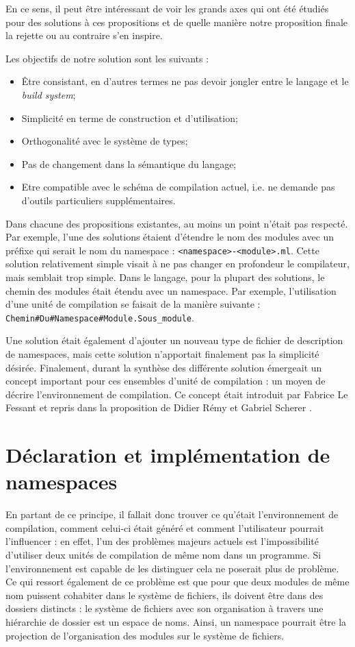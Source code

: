 \documentclass[11pt,a4paper]{report}
\begin{document}
En ce sens, il peut être intéressant de voir les grands axes qui ont été étudiés
pour des solutions à ces propositions et de quelle manière notre proposition
finale la rejette ou au contraire s'en inspire.

Les objectifs de notre solution sont les suivants :
\begin{itemize}
\item \^{E}tre consistant, en d'autres termes ne pas devoir jongler entre le
  langage et le \emph{build system};
\item Simplicité en terme de construction et d'utilisation;
\item Orthogonalité avec le système de types;
\item Pas de changement dans la sémantique du langage;
\item Etre compatible avec le schéma de compilation actuel, i.e. ne demande
  pas d'outils particuliers supplémentaires.
\end{itemize}

Dans chacune des propositions existantes, au moins un point n'était pas
respecté. Par exemple, l'une des solutions étaient d'étendre le nom des modules
avec un préfixe qui serait le nom du namespace :
\texttt{<namespace>-<module>.ml}. Cette solution relativement simple visait à ne
pas changer en profondeur le compilateur, mais semblait trop simple. Dans le
langage, pour la plupart des solutions, le chemin des modules était étendu avec
un namespace. Par exemple, l'utilisation d'une unité de compilation se faisait
de la manière suivante :
\texttt{Chemin\#Du\#Namespace\#Module.Sous\_module}. 

Une solution était également d'ajouter un nouveau type de fichier de description
de namespaces, mais cette solution n'apportait finalement pas la simplicité
désirée. Finalement, durant la synthèse des différente solution émergeait un
concept important pour ces ensembles d'unité de compilation : un moyen de
décrire l'environnement de compilation. Ce concept était introduit par Fabrice
Le Fessant \cite{lefessant-prop} et repris dans la proposition de Didier Rémy et
Gabriel Scherer \cite{remy-scherer-prop}.

\section{Déclaration et implémentation de namespaces}

En partant de ce principe, il fallait donc trouver ce qu'était l'environnement
de compilation, comment celui-ci était généré et comment l'utilisateur pourrait
l'influencer : en effet, l'un des problèmes majeurs actuels est l'impossibilité
d'utiliser deux unités de compilation de même nom dans un programme. Si
l'environnement est capable de les distinguer cela ne poserait plus de
problème. Ce qui ressort également de ce problème est que pour que deux modules
de même nom puissent cohabiter dans le système de fichiers, ils doivent être
dans des dossiers distincts : le système de fichiers avec son organisation à
travers une hiérarchie de dossier est un espace de noms. Ainsi, un namespace
pourrait être la projection de l'organisation des modules sur le système de
fichiers.
\end{document}
